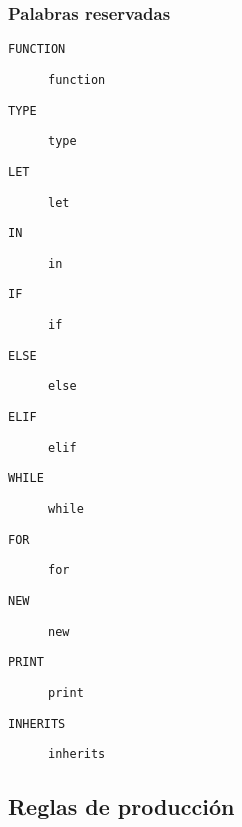 \documentclass[a4paper,12pt]{article}
\begin{document}
\subsubsection*{Palabras reservadas}
\begin{description}
    \item[\texttt{FUNCTION}] \verb|function|
    \item[\texttt{TYPE}] \verb|type|
    \item[\texttt{LET}] \verb|let|
    \item[\texttt{IN}] \verb|in|
    \item[\texttt{IF}] \verb|if|
    \item[\texttt{ELSE}] \verb|else|
    \item[\texttt{ELIF}] \verb|elif|
    \item[\texttt{WHILE}] \verb|while|
    \item[\texttt{FOR}] \verb|for|
    \item[\texttt{NEW}] \verb|new|
    \item[\texttt{PRINT}] \verb|print|
    \item[\texttt{INHERITS}] \verb|inherits|
\end{description}

\subsection*{Reglas de producción}
\end{document}
